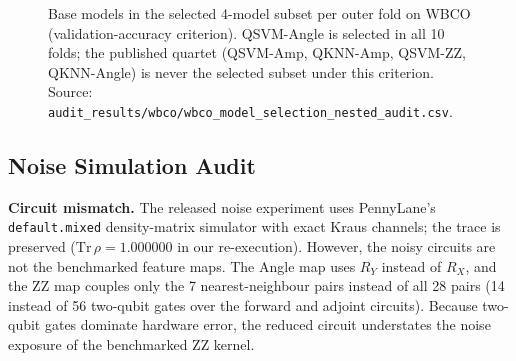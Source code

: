 \documentclass[journal,twocolumn]{IEEEtran}
\begin{document}
\begin{figure}[!t]
\centering
{}
\caption{Base models in the selected 4-model subset per outer fold on WBCO (validation-accuracy criterion). QSVM-Angle is selected in all 10 folds; the published quartet (QSVM-Amp, QKNN-Amp, QSVM-ZZ, QKNN-Angle) is never the selected subset under this criterion. Source: \texttt{audit\_results/wbco/wbco\_model\_selection\_nested\_audit.csv}.}
\label{fig:selection_heatmap}
\end{figure}

\subsection{Noise Simulation Audit}
\label{sec:noise}

\textbf{Circuit mismatch.} The released noise experiment uses PennyLane's \texttt{default.mixed} density-matrix simulator with exact Kraus channels; the trace is preserved ($\text{Tr}\,\rho = 1.000000$ in our re-execution). However, the noisy circuits are not the benchmarked feature maps. The Angle map uses $R_Y$ instead of $R_X$, and the ZZ map couples only the 7 nearest-neighbour pairs instead of all 28 pairs (14 instead of 56 two-qubit gates over the forward and adjoint circuits). Because two-qubit gates dominate hardware error, the reduced circuit understates the noise exposure of the benchmarked ZZ kernel.
\end{document}
